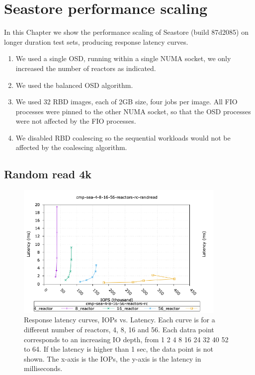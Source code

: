 \graphicspath{ {../figures/} }

\chapter{Seastore performance scaling}

In this Chapter we show the performance scaling of Seastore (build 87d2085) on longer
duration test sets, producing response latency curves. 

\begin{enumerate}
  \item We used a single OSD, running within a single NUMA socket, we only increased the number of reactors as indicated.
  \item We used the balanced OSD algorithm.
  \item We used 32 RBD images, each of 2GB size, four jobs per image. All FIO processes were pinned to the other NUMA socket, so that the OSD processes were not affected by the FIO processes.
  \item We disabled RBD coalescing so the sequential workloads would not be affected by the coalescing algorithm.
\end{enumerate}
\section{Random read 4k}

\begin{figure}[!ht]
  \centering
  \includegraphics[width=0.9\textwidth]{cmp_sea_4_8_16_56_reactors_rc_randread_iops_vs_lat.png}
  \caption{Response latency curves, IOPs vs. Latency. Each curve is for a different number of reactors, 4, 8, 16 and 56. Each datra point corresponds to an increasing IO depth, from 1 2 4 8 16 24 32 40 52 to 64. If the latency is higher than 1 sec, the data point is not shown. The x-axis is the IOPs, the y-axis is the latency in milliseconds.}
\end{figure}

